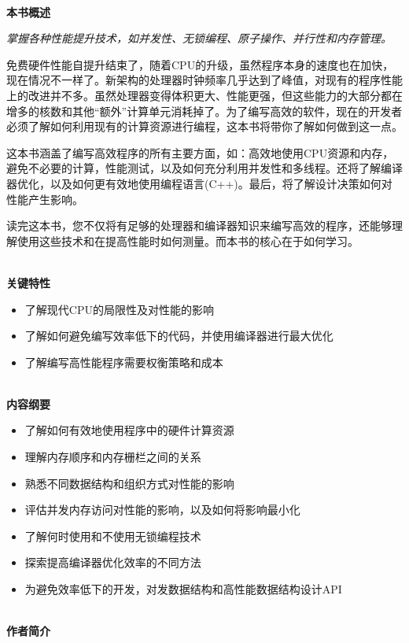 \documentclass[11pt,a4paper,UTF8]{book}
\begin{document}
\hspace*{\fill} \\ %
\noindent\textbf{本书概述}

\textit{掌握各种性能提升技术，如并发性、无锁编程、原子操作、并行性和内存管理。}

免费硬件性能自提升结束了，随着CPU的升级，虽然程序本身的速度也在加快，现在情况不一样了。新架构的处理器时钟频率几乎达到了峰值，对现有的程序性能上的改进并不多。虽然处理器变得体积更大、性能更强，但这些能力的大部分都在增多的核数和其他“额外”计算单元消耗掉了。为了编写高效的软件，现在的开发者必须了解如何利用现有的计算资源进行编程，这本书将带你了解如何做到这一点。

这本书涵盖了编写高效程序的所有主要方面，如：高效地使用CPU资源和内存，避免不必要的计算，性能测试，以及如何充分利用并发性和多线程。还将了解编译器优化，以及如何更有效地使用编程语言(C++)。最后，将了解设计决策如何对性能产生影响。

读完这本书，您不仅将有足够的处理器和编译器知识来编写高效的程序，还能够理解使用这些技术和在提高性能时如何测量。而本书的核心在于如何学习。

\hspace*{\fill} \\ %
\noindent\textbf{关键特性}
\begin{itemize}
\item 了解现代CPU的局限性及对性能的影响
\item 了解如何避免编写效率低下的代码，并使用编译器进行最大优化
\item 了解编写高性能程序需要权衡策略和成本
\end{itemize}

\hspace*{\fill} \\ %
\noindent\textbf{内容纲要}
\begin{itemize}
\item 了解如何有效地使用程序中的硬件计算资源
\item 理解内存顺序和内存栅栏之间的关系
\item 熟悉不同数据结构和组织方式对性能的影响
\item 评估并发内存访问对性能的影响，以及如何将影响最小化
\item 了解何时使用和不使用无锁编程技术
\item 探索提高编译器优化效率的不同方法
\item 为避免效率低下的开发，对发数据结构和高性能数据结构设计API
\end{itemize}

\hspace*{\fill} \\ %
\noindent\textbf{作者简介}
\end{document}
